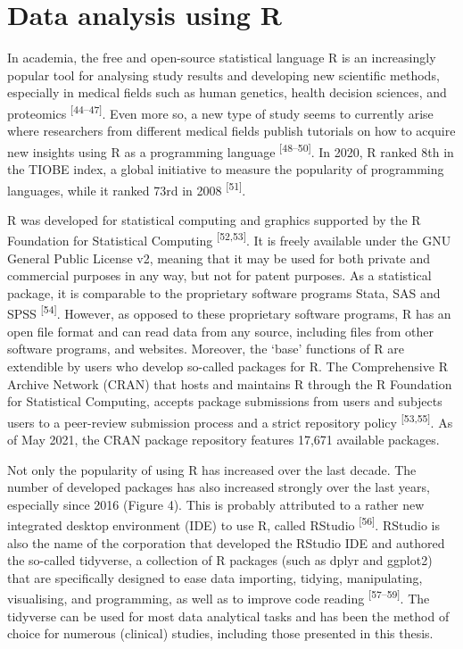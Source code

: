 \documentclass[
]{book}
\begin{document}
\hypertarget{data-analysis-using-r}{%
\section{Data analysis using R}\label{data-analysis-using-r}}

In academia, the free and open-source statistical language R is an increasingly popular tool for analysing study results and developing new scientific methods, especially in medical fields such as human genetics, health decision sciences, and proteomics \textsuperscript{{[}44--47{]}}. Even more so, a new type of study seems to currently arise where researchers from different medical fields publish tutorials on how to acquire new insights using R as a programming language \textsuperscript{{[}48--50{]}}. In 2020, R ranked 8th in the TIOBE index, a global initiative to measure the popularity of programming languages, while it ranked 73rd in 2008 \textsuperscript{{[}51{]}}.

R was developed for statistical computing and graphics supported by the R Foundation for Statistical Computing \textsuperscript{{[}52,53{]}}. It is freely available under the GNU General Public License v2, meaning that it may be used for both private and commercial purposes in any way, but not for patent purposes. As a statistical package, it is comparable to the proprietary software programs Stata, SAS and SPSS \textsuperscript{{[}54{]}}. However, as opposed to these proprietary software programs, R has an open file format and can read data from any source, including files from other software programs, and websites. Moreover, the `base' functions of R are extendible by users who develop so-called packages for R. The Comprehensive R Archive Network (CRAN) that hosts and maintains R through the R Foundation for Statistical Computing, accepts package submissions from users and subjects users to a peer-review submission process and a strict repository policy \textsuperscript{{[}53,55{]}}. As of May 2021, the CRAN package repository features 17,671 available packages.

Not only the popularity of using R has increased over the last decade. The number of developed packages has also increased strongly over the last years, especially since 2016 (Figure 4). This is probably attributed to a rather new integrated desktop environment (IDE) to use R, called RStudio \textsuperscript{{[}56{]}}. RStudio is also the name of the corporation that developed the RStudio IDE and authored the so-called tidyverse, a collection of R packages (such as dplyr and ggplot2) that are specifically designed to ease data importing, tidying, manipulating, visualising, and programming, as well as to improve code reading \textsuperscript{{[}57--59{]}}. The tidyverse can be used for most data analytical tasks and has been the method of choice for numerous (clinical) studies, including those presented in this thesis.
\end{document}
